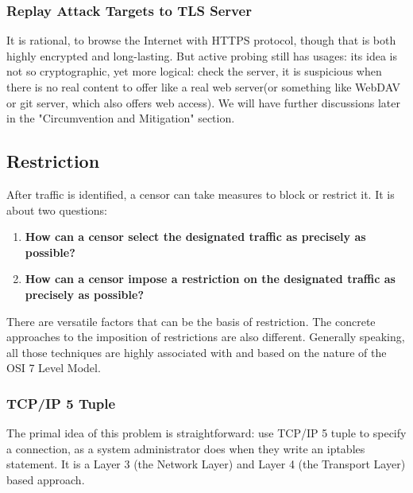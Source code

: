 \documentclass[conference]{IEEEtran}
\begin{document}
\subsubsection{Replay Attack Targets to TLS Server}
It is rational, to browse the Internet with HTTPS protocol, though that is both highly encrypted and long-lasting. But active probing still has usages: its idea is not so cryptographic, yet more logical: check the server, it is suspicious when there is no real content to offer like a real web server(or something like WebDAV or git server, which also offers web access).
We will have further discussions later in the "Circumvention and Mitigation" section.

\subsection{Restriction}
After traffic is identified, a censor can take measures to block or restrict it.
It is about two questions:
\begin{enumerate}
    \item \textbf{How can a censor select the designated traffic as precisely as possible?}
    \item \textbf{How can a censor impose a restriction on the designated traffic as precisely as possible?}
\end{enumerate}
There are versatile factors that can be the basis of restriction. The concrete approaches to the imposition of restrictions are also different. Generally speaking, all those techniques are highly associated with and based on the nature of the OSI 7 Level Model.

\subsubsection{TCP/IP 5 Tuple}
The primal idea of this problem is straightforward: use TCP/IP 5 tuple to specify a connection, as a system administrator does when they write an iptables statement. It is a Layer 3 (the Network Layer) and Layer 4 (the Transport Layer) based approach.
\end{document}
